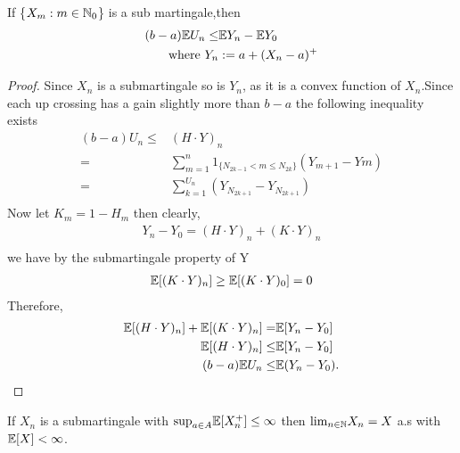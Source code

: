\documentclass[a4paper,10pt,english]{article}
\begin{document}
\begin{lem}
	If \{$X_m: m \in \mathbb{N}_0$\} is a sub martingale,then
	\begin{align*}
	(b-a)\mathbb{E} U_n\leq& \mathbb{E} Y_n-\mathbb{E} Y_0\\
	\text{where }Y_n&:=a+ (X_n-a)^{+}
    \end{align*}
    \end{lem}
\begin{proof}
Since $X_n$ is a submartingale so is $Y_n$, as it is  a convex function of $X_n$.Since each up crossing has a gain slightly  more than $b-a$ the following inequality exists \\
\begin{align*}
(b-a)U_n\leq &(H\cdot Y)_n\\
=&\sum_{m=1}^{n}1_{\{N_{2k-1}<m\leq N_{2k}\}}(Y_{m+1}-Y{m})\\
=&\sum_{k=1}^{U_n}(Y_{N_{2k+1}}-Y_{N_{2k+1}})\\ 
\end{align*}
   Now let $K_m=1-H_m$ then clearly,
   \begin{align*}
   	Y_n-Y_0=(H\cdot Y)_n+(K\cdot Y)_n\\
   \end{align*} 
   we have by the submartingale property of Y\\
    \begin{align*}
    	\mathbb{E}[(K\cdot Y)_n] \geq \mathbb{E}[(K\cdot Y)_0]=0\\   	
    \end{align*} 
    Therefore,
    \begin{align*}
    \mathbb{E}[(H\cdot Y)_n]+\mathbb{E}[(K\cdot Y)_n]=& \mathbb{E}[Y_n-Y_0]\\
    \mathbb{E}[(H\cdot Y)_n]\leq& \mathbb{E}[Y_n-Y_0]\\
    (b-a)\mathbb{E} U_n\leq& \mathbb{E}(Y_n-Y_0).
    \end{align*}
    \end{proof}
\begin{thm}
\label{MartingaleConvergenceTheorem}
If $X_n$ is a submartingale with ${\sup}_{a\in A} \mathbb{E}[X_n^{+}]\leq \infty$ then ${\lim}_{n\in \mathbb{N}} X_n=X$ a.s with $\mathbb{E}[X]<\infty$.
\end{thm}
\end{document}

